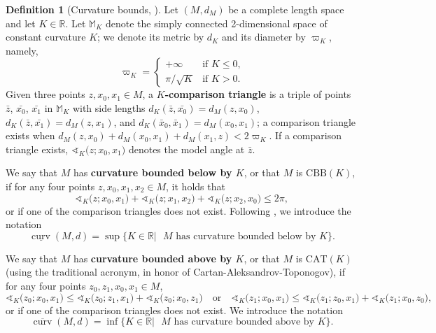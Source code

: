 \documentclass{article}
\theoremstyle{definition}
\newtheorem{definition}[proposition]{Definition}
\newcommand{\R}{\mathbb{R}}
\newcommand{\curv}{\underline{\operatorname{curv}}}
\newcommand{\curvupper}{\overline{\operatorname{curv}}}
\newcommand{\angk}[2]{{\sphericalangle_K}\bigl(#1;#2\bigr)}
\begin{document}
\begin{definition}[Curvature bounds, \cite{alexander2024alexandrov}]
    Let $(M,d_M)$ be a complete length space and let $K \in \R$. Let $\mathbb{M}_K$ denote the simply connected 2-dimensional space of constant curvature $K$; we denote its metric by $d_K$ and its diameter by $\varpi_K$, namely,
    \begin{equation}\label{eqn:diameter_model_space}
        \varpi_K = \left\{\begin{array}{rl}
        +\infty & \mbox{if $K \leq 0$,}\\
        \pi/\sqrt{K} & \mbox{if $K > 0$.}
        \end{array}\right.
    \end{equation} 
    Given three points $z, x_0, x_1 \in M$, a \textbf{$K$-comparison triangle} is a triple of points $\bar{z}$, $\bar{x_0}$, $\bar{x_1}$ in $\mathbb{M}_K$ with side lengths $d_K(\bar{z},\bar{x_0}) = d_M(z, x_0)$, $d_K(\bar{z},\bar{x_1}) = d_M(z, x_1)$, and $d_K(\bar{x}_0,\bar{x}_1) = d_M(x_0, x_1)$; a comparison triangle exists when $d_M(z,x_0) + d_M(x_0,x_1) + d_M(x_1,z) < 2 \varpi_K$. If a comparison triangle exists, $\angk{z}{x_0, x_1}$ denotes the model angle at $\bar{z}$.

    We say that $M$ has \textbf{curvature bounded below by $K$}, or that $M$ is $\mathrm{CBB}(K)$, if for any four points $z,x_0,x_1,x_2 \in M$, it holds that 
\begin{equation}
    \angk{z}{x_0, x_1} + \angk{z}{x_1, x_2} + \angk{z}{x_2, x_0} \leq 2\pi,
\end{equation}
    or if one of the comparison triangles does not exist. 
    Following \cite[Section 2.2]{Sturm2006geometryI}, we introduce the notation 
    \begin{equation}
        \curv(M, d) = \sup\{K\in \mathbb{R}| \mbox{ $M$ has curvature bounded below by $K$}\}.
    \end{equation}

    We say that $M$ has \textbf{curvature bounded above by $K$}, or that $M$ is $\mathrm{CAT}(K)$ (using the traditional acronym, in honor of Cartan-Aleksandrov-Toponogov), if for any four points $z_0, z_1, x_0, x_1 \in M$,
    \[
    \angk{z_0}{x_0, x_1} \leq \angk{z_0}{z_1, x_1} + \angk{z_0}{x_0, z_1} \quad \mbox{or} \quad \angk{z_1}{x_0, x_1} \leq \angk{z_1}{z_0, x_1} + \angk{z_1}{x_0, z_0},
    \]
    or if one of the comparison triangles does not exist. 
    We introduce the notation 
    \begin{equation}
        \curvupper(M, d) = \inf\{K\in \mathbb{R}| \mbox{ $M$ has curvature bounded above by $K$}\}.
    \end{equation}
\end{definition}
\end{document}
